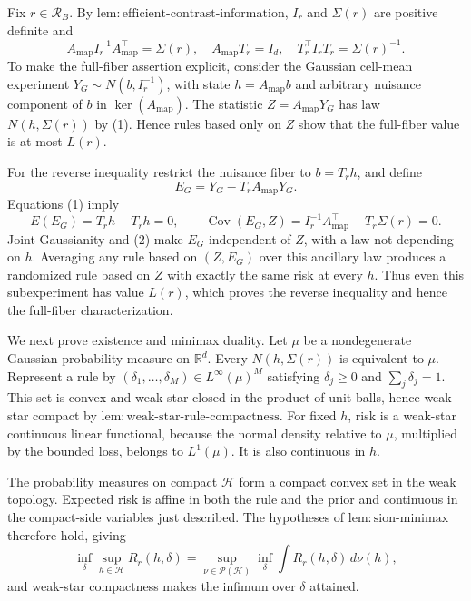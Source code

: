 Fix \(r\in\mathcal R_B\).  By \(\mathrm{lem:efficient\text{-}contrast\text{-}information}\), \(I_r\) and \(\Sigma(r)\) are positive definite and
\[
 A_{\mathrm{map}}I_r^{-1}A_{\mathrm{map}}^\top=\Sigma(r),\quad
 A_{\mathrm{map}}T_r=I_d,\quad T_r^\top I_rT_r=\Sigma(r)^{-1}.        \tag{1}
\]
To make the full-fiber assertion explicit, consider the Gaussian cell-mean experiment \(Y_G\sim N(b,I_r^{-1})\), with state \(h=A_{\mathrm{map}}b\) and arbitrary nuisance component of \(b\) in \(\ker(A_{\mathrm{map}})\).  The statistic \(Z=A_{\mathrm{map}}Y_G\) has law \(N(h,\Sigma(r))\) by (1).  Hence rules based only on \(Z\) show that the full-fiber value is at most \(L(r)\).

For the reverse inequality restrict the nuisance fiber to \(b=T_rh\), and define
\[
 E_G=Y_G-T_rA_{\mathrm{map}}Y_G.
\]
Equations (1) imply
\[
 E(E_G)=T_rh-T_rh=0,\qquad
 \operatorname{Cov}(E_G,Z)=I_r^{-1}A_{\mathrm{map}}^\top-T_r\Sigma(r)=0. \tag{2}
\]
Joint Gaussianity and (2) make \(E_G\) independent of \(Z\), with a law not depending on \(h\).  Averaging any rule based on \((Z,E_G)\) over this ancillary law produces a randomized rule based on \(Z\) with exactly the same risk at every \(h\).  Thus even this subexperiment has value \(L(r)\), which proves the reverse inequality and hence the full-fiber characterization.

We next prove existence and minimax duality.  Let \(\mu\) be a nondegenerate Gaussian probability measure on \(\mathbb R^d\).  Every \(N(h,\Sigma(r))\) is equivalent to \(\mu\).  Represent a rule by \((\delta_1,\ldots,\delta_M)\in L^\infty(\mu)^M\) satisfying \(\delta_j\geq0\) and \(\sum_j\delta_j=1\).  This set is convex and weak-star closed in the product of unit balls, hence weak-star compact by \(\mathrm{lem:weak\text{-}star\text{-}rule\text{-}compactness}\).  For fixed \(h\), risk is a weak-star continuous linear functional, because the normal density relative to \(\mu\), multiplied by the bounded loss, belongs to \(L^1(\mu)\).  It is also continuous in \(h\).

The probability measures on compact \(\mathcal H\) form a compact convex set in the weak topology.  Expected risk is affine in both the rule and the prior and continuous in the compact-side variables just described.  The hypotheses of \(\mathrm{lem:sion\text{-}minimax}\) therefore hold, giving
\[
 \inf_\delta\sup_{h\in\mathcal H}R_r(h,\delta)
 =\sup_{\nu\in\mathcal P(\mathcal H)}\inf_\delta
   \int R_r(h,\delta)\,d\nu(h),                                    \tag{3}
\]
and weak-star compactness makes the infimum over \(\delta\) attained.

